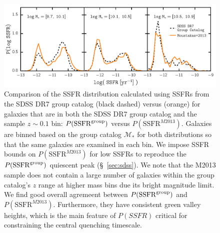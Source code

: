 \begin{figure}
\begin{center}
\includegraphics[width=\textwidth]{figs/cenq/Pssfr_comparison.pdf}
\caption{
Comparison of the SSFR distribution calculated using 
SSFRs from the SDSS DR7 group catalog (black dashed) versus
\cite{Moustakas:2013aa} (orange) for galaxies that are in 
both the SDSS DR7 group catalog and the \cite{Moustakas:2013aa} 
sample $z\sim0.1$ bin: $P(\mathrm{SSFR}^{\rm group})$ versus 
$P(\mathrm{SSFR}^{M2013})$. Galaxies are binned based on the
group catalog $\mathcal{M}_*$ for both distributions so that 
the same galaxies are examined in each bin. We impose SSFR 
bounds on $P(\mathrm{SSFR}^{M2013})$ for low SSFRs to reproduce 
the $P(\mathrm{SSFR}^{\rm group})$ quiescent peak (\S~\ref{sec:sdss}). 
We note that the M2013 sample does not contain a large number 
of galaxies within the group catalog's $z$ range at higher 
mass bins due its bright magnitude limit.
We find good overall agremeent between $P(\mathrm{SSFR}^{\rm group})$ 
and $P(\mathrm{SSFR}^{M2013})$. Furthermore, they have consistent 
green valley heights, which is the main feature of $P(SSFR)$ critical 
for constraining the central quenching timescale.
}
\label{fig:Pssfr_comp}
\end{center}
\end{figure}

